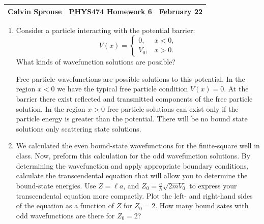 \documentclass[a4paper, 12pt]{config/homework}
\begin{document}
\noindent
\begin{tabularx}{\textwidth}{>{\centering\arraybackslash}X>{\centering\arraybackslash}X>{\centering\arraybackslash}X}
Calvin Sprouse & PHYS474 Homework 6 & 2024 February 22\\
\midrule
\end{tabularx}

\begin{enumerate}
\item Consider a particle interacting with the potential barrier:
\[V(x) = \begin{cases}
0, & x < 0, \\ V_0, & x > 0.
\end{cases}\]
What kinds of wavefunction solutions are possible?

Free particle wavefunctions are possible solutions to this potential.
In the region \(x<0\) we have the typical free particle condition \(V(x)=0\).
At the barrier there exist reflected and transmitted components of the free particle solution.
In the region \(x>0\) free particle solutions can exist only if the particle energy is greater than the potential.
There will be no bound state solutions only scattering state solutions.

\vspace{\baselineskip}
\item We calculated the even bound-state wavefunctions for the finite-square well in class. Now, preform this calculation for the odd wavefunction solutions. By determining the wavefunction and apply appropriate boundary conditions, calculate the transcendental equation that will allow you to determine the bound-state energies. Use \(Z = \ell a\), and \(Z_0 = \frac{a}{\hbar}\sqrt{2mV_0}\) to express your transcendental equation more compactly.
Plot the left- and right-hand sides of the equation as a function of \(Z\) for \(Z_0=2\). How many bound sates with odd wavefunctions are there for \(Z_0=2\)?


\end{enumerate}
\end{document}
